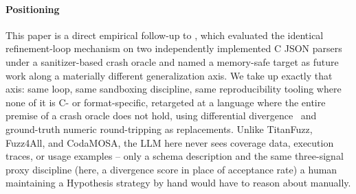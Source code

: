\paragraph{Positioning} This paper is a direct empirical follow-up to
\priorworkcite, which evaluated the identical refinement-loop
mechanism on two independently implemented C JSON parsers under a
sanitizer-based crash oracle and named a memory-safe target as future work
along a materially different generalization axis. We take up exactly that
axis: same loop, same sandboxing discipline, same reproducibility tooling
where none of it is C- or format-specific, retargeted at a language where
the entire premise of a crash oracle does not hold, using differential
divergence~\cite{mckeeman1998differential} and ground-truth numeric
round-tripping as replacements. Unlike TitanFuzz, Fuzz4All, and CodaMOSA,
the LLM here never sees coverage data, execution traces, or usage examples --
only a schema description and the same three-signal proxy discipline (here,
a divergence score in place of acceptance rate) a human maintaining a
Hypothesis strategy by hand would have to reason about manually.
